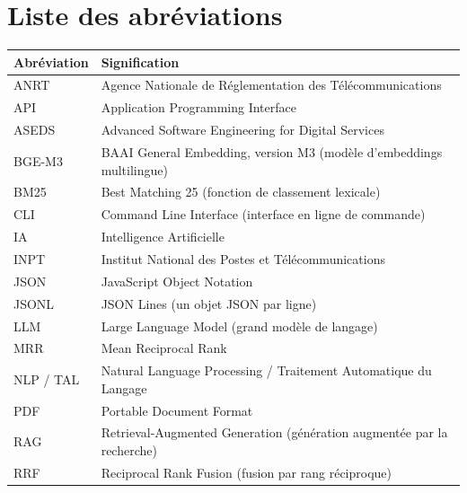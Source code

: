 \chapter*{Liste des abréviations}

\begin{table}[H]
\centering
\begin{tabular}{l l}
\textbf{Abréviation} & \textbf{Signification} \\
\hline
ANRT & Agence Nationale de Réglementation des Télécommunications \\
API & Application Programming Interface \\
ASEDS & Advanced Software Engineering for Digital Services \\
BGE-M3 & BAAI General Embedding, version M3 (modèle d'embeddings multilingue) \\
BM25 & Best Matching 25 (fonction de classement lexicale) \\
CLI & Command Line Interface (interface en ligne de commande) \\
IA & Intelligence Artificielle \\
INPT & Institut National des Postes et Télécommunications \\
JSON & JavaScript Object Notation \\
JSONL & JSON Lines (un objet JSON par ligne) \\
LLM & Large Language Model (grand modèle de langage) \\
MRR & Mean Reciprocal Rank \\
NLP / TAL & Natural Language Processing / Traitement Automatique du Langage \\
PDF & Portable Document Format \\
RAG & Retrieval-Augmented Generation (génération augmentée par la recherche) \\
RRF & Reciprocal Rank Fusion (fusion par rang réciproque) \\
\end{tabular}
\end{table}
